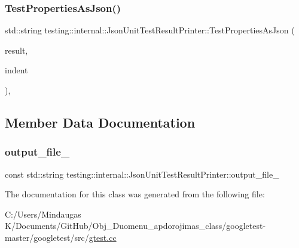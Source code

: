 \mbox{\label{classtesting_1_1internal_1_1_json_unit_test_result_printer_af6c2baf27486ffa5ac7fd328044ec235}} 
\subsubsection{\texorpdfstring{TestPropertiesAsJson()}{TestPropertiesAsJson()}\hspace{0.1cm}{\footnotesize\ttfamily [3/3]}}
{\footnotesize\ttfamily std\+::string testing\+::internal\+::\+Json\+Unit\+Test\+Result\+Printer\+::\+Test\+Properties\+As\+Json (\begin{DoxyParamCaption}\item[{const \mbox{\hyperlink{classtesting_1_1_test_result}{Test\+Result}} \&}]{result,  }\item[{const std\+::string \&}]{indent }\end{DoxyParamCaption})\hspace{0.3cm}{\ttfamily [static]}, {\ttfamily [private]}}



\subsection{Member Data Documentation}
\mbox{\label{classtesting_1_1internal_1_1_json_unit_test_result_printer_a0471c1f94083f864b5e4d98fd9e80207}} 
\subsubsection{\texorpdfstring{output\_file\_}{output\_file\_}}
{\footnotesize\ttfamily const std\+::string testing\+::internal\+::\+Json\+Unit\+Test\+Result\+Printer\+::output\+\_\+file\+\_\+\hspace{0.3cm}{\ttfamily [private]}}



The documentation for this class was generated from the following file\+:\begin{DoxyCompactItemize}
\item 
C\+:/\+Users/\+Mindaugas K/\+Documents/\+Git\+Hub/\+Obj\+\_\+\+Duomenu\+\_\+apdorojimas\+\_\+class/googletest-\/master/googletest/src/\mbox{\hyperlink{googletest-master_2googletest_2src_2gtest_8cc}{gtest.\+cc}}\end{DoxyCompactItemize}
